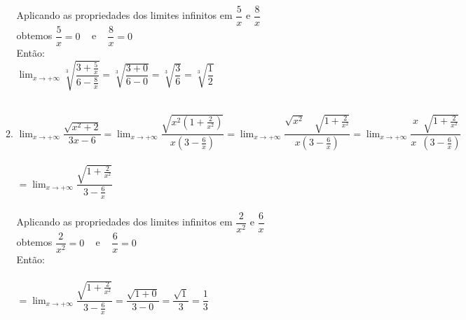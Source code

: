 \documentclass[a4paper, 12pt]{article}
\begin{document}
\begin{enumerate}
\begin{enumerate}
	Aplicando as propriedades dos limites infinitos em $\dfrac{5}{x}$ e $\dfrac{8}{x}$\\ obtemos  $\dfrac{5}{x} = 0$ \,\,\, e \,\,\, $\dfrac{8}{x} = 0$ \\ 

	Então:\\

	$\displaystyle{\lim_{x\to+\infty} \sqrt[3]{\dfrac{3 +\frac{5}{x}}{6 - \frac{8}{x}}}} = \displaystyle{\sqrt[3]{\dfrac{3 + 0}{6 - 0}}} = \displaystyle{\sqrt[3]{\dfrac{3}		{6}}} = \displaystyle{\sqrt[3]{\dfrac{1}{2}}}$ \\ \\
	
	\item $\displaystyle{\lim_{x\to+\infty} \dfrac{\sqrt{x^2 + 2}}{3x -6}} = \displaystyle{\lim_{x\to+\infty} \dfrac{\sqrt{x^2(1 + \frac{2}{x^2})}}{x(3 - \frac{6}{x})}} =  \displaystyle{\lim_{x\to+\infty} \dfrac{\sqrt{x^2} \,\,\,\,\,\, \sqrt{1 + \frac{2}{x^2}}}{x(3 - \frac{6}{x})}} =  \displaystyle{\lim_{x\to+\infty} \dfrac{x \,\,\, \sqrt{1 + \frac{2}{x^2}}}{x \,\,\, (3 - \frac{6}{x})}}$\\ \\

$= \displaystyle{\lim_{x\to+\infty} \dfrac{\sqrt{1 + \frac{2}{x^2}}}{3 - \frac{6}{x}}}$ \\ \\
	 
	 	
	Aplicando as propriedades dos limites infinitos em $\dfrac{2}{x^2}$ e $\dfrac{6}{x}$\\ obtemos  $\dfrac{2}{x^2} = 0$ \,\,\, e \,\,\, $\dfrac{6}{x} = 0$ \\ 

	Então:\\ \\
	
		 $= \displaystyle{\lim_{x\to+\infty} \dfrac{\sqrt{1 + \frac{2}{x^2}}}{3 - \frac{6}{x}}} = \displaystyle{\dfrac{\sqrt{1 + 0}}{3 - 0}} = \displaystyle{\dfrac{\sqrt{1}}{3}} = \displaystyle{\dfrac{1}{3}}$
	
	

	


	

\end{enumerate}
	
	 
\end{enumerate}

 
\end{document}
